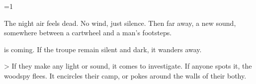 \ifnum\value{cycle}=1


\begin{boxtext}
  The night air feels dead.
  No wind, just silence.
  Then far away, a new sound, somewhere between a cartwheel and a man's footsteps.
\end{boxtext}

 is coming.
If the troupe remain silent and dark, it wanders away.

\woodspy

\ifnum\value{r12}>\value{hp}%
  If they make any light or sound, it comes to investigate.
  If anyone spots it, the \gls{woodspy} flees.
\else%
  It encircles their camp, or pokes around the walls of their \gls{bothy}.
\fi%

\fi
